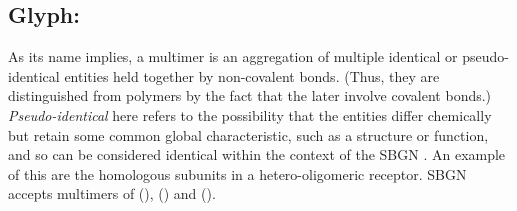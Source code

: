 
\subsection{Glyph: }
\label{sec:multimer}

As its name implies, a multimer is an aggregation of multiple identical or pseudo-identical entities held together by non-covalent bonds.  (Thus, they are distinguished from polymers by the fact that the later involve covalent bonds.)  \emph{Pseudo-identical} here refers to the possibility that the entities differ chemically but retain some common global characteristic, such as a structure or function, and so can be considered identical within the context of the SBGN \PD.  An example of this are the homologous subunits in a hetero-oligomeric receptor. SBGN \PD accepts multimers of  (),  () and  ().

